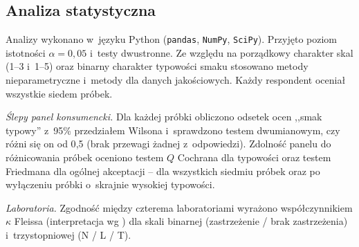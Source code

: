 
\subsection{Analiza statystyczna}
\label{sub:statystyka}

Analizy wykonano w~języku Python (\texttt{pandas}, \texttt{NumPy},
\texttt{SciPy}). Przyjęto poziom istotności $\alpha = 0{,}05$ i~testy
dwustronne. Ze względu na porządkowy charakter skal (1--3 i~1--5) oraz
binarny charakter typowości smaku stosowano metody nieparametryczne
i~metody dla danych jakościowych. Każdy respondent oceniał wszystkie siedem
próbek.

\textit{Ślepy panel konsumencki.} Dla każdej próbki obliczono odsetek ocen ,,smak
typowy'' z~95\% przedziałem Wilsona \cite{Wilson1927} i~sprawdzono testem
dwumianowym, czy różni się on od 0{,}5 (brak przewagi żadnej z~odpowiedzi).
Zdolność panelu do różnicowania próbek oceniono testem $Q$ Cochrana dla
typowości \cite{Cochran1950} oraz testem Friedmana dla ogólnej akceptacji
-- dla wszystkich siedmiu próbek oraz po wyłączeniu próbki o~skrajnie
wysokiej typowości.

\textit{Laboratoria.} Zgodność między czterema laboratoriami wyrażono
współczynnikiem $\kappa$ Fleissa \cite{Fleiss1971} (interpretacja wg
\cite{LandisKoch1977}) dla skali binarnej (zastrzeżenie / brak
zastrzeżenia) i~trzystopniowej (N / L / T).

